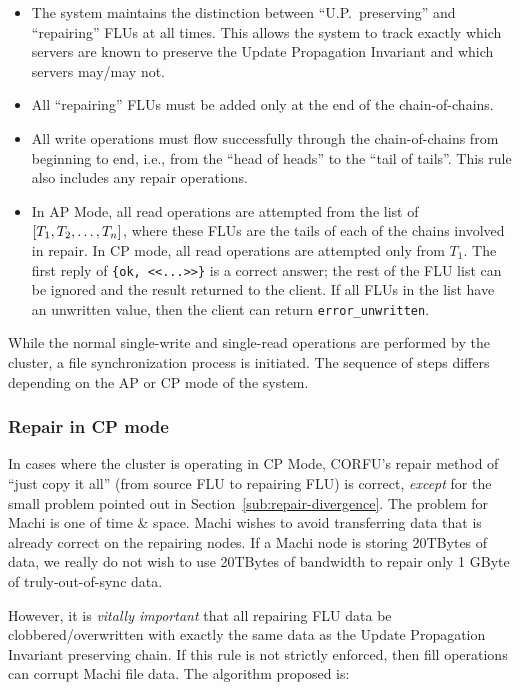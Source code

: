 \documentclass[preprint,10pt]{sigplanconf}
\begin{document}
\begin{itemize}

\item The system maintains the distinction between ``U.P.~preserving''
  and ``repairing'' FLUs at all times.  This allows the system to
  track exactly which servers are known to preserve the Update
  Propagation Invariant and which servers may/may not.

\item All ``repairing'' FLUs must be added only at the end of the
  chain-of-chains.

\item All write operations must flow successfully through the
  chain-of-chains from beginning to end, i.e., from the ``head of
  heads'' to the ``tail of tails''.  This rule also includes any
  repair operations.

\item In AP Mode, all read operations are attempted from the list of
$[T_1,\-T_2,\-\ldots,\-T_n]$, where these FLUs are the tails of each of the
chains involved in repair.
In CP mode, all read operations are attempted only from $T_1$.
The first reply of {\tt \{ok, <<...>>\}} is a correct answer;
the rest of the FLU list can be ignored and the result returned to the
client.  If all FLUs in the list have an unwritten value, then the
client can return {\tt error\_unwritten}.

\end{itemize}

While the normal single-write and single-read operations are performed
by the cluster, a file synchronization process is initiated.  The
sequence of steps differs depending on the AP or CP mode of the system.

\subsubsection{Repair in CP mode}

In cases where the cluster is operating in CP Mode,
CORFU's repair method of ``just copy it all'' (from source FLU to repairing
FLU) is correct, {\em except} for the small problem pointed out in
Section~\ref{sub:repair-divergence}.  The problem for Machi is one of
time \& space.  Machi wishes to avoid transferring data that is
already correct on the repairing nodes.  If a Machi node is storing
20TBytes of data, we really do not wish to use 20TBytes of bandwidth
to repair only 1 GByte of truly-out-of-sync data.

However, it is {\em vitally important} that all repairing FLU data be
clobbered/overwritten with exactly the same data as the Update
Propagation Invariant preserving chain.  If this rule is not strictly
enforced, then fill operations can corrupt Machi file data.  The
algorithm proposed is:
\end{document}
